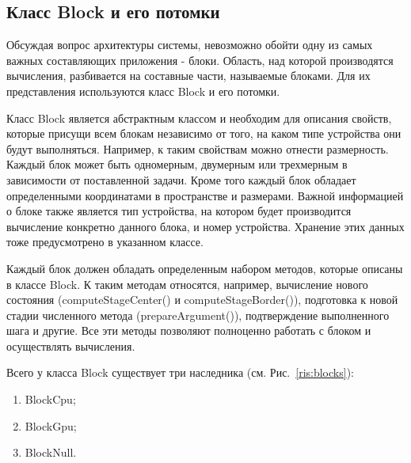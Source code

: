 \documentclass[a4paper, 14pt]{extarticle}
\theoremstyle{definition}
\begin{document}
\subsection{Класс Block и его потомки}

\par Обсуждая вопрос архитектуры системы, невозможно обойти одну из самых важных составляющих приложения - блоки. Область, над которой производятся вычисления, разбивается на составные части, называемые блоками. Для их представления используются класс Block и его потомки.

\par Класс Block является абстрактным классом и необходим для описания свойств, которые присущи всем блокам независимо от того, на каком типе устройства они будут выполняться. Например, к таким свойствам можно отнести размерность. Каждый блок может быть одномерным, двумерным или трехмерным в зависимости от поставленной задачи. Кроме того каждый блок обладает определенными координатами в пространстве и размерами. Важной информацией о блоке также является тип устройства, на котором будет производится вычисление конкретно данного блока, и номер устройства. Хранение этих данных тоже предусмотрено в указанном классе.

\par Каждый блок должен обладать определенным набором методов, которые описаны в классе Block. К таким методам относятся, например, вычисление нового состояния (computeStageCenter() и computeStageBorder()), подготовка к новой стадии численного метода (prepareArgument()), подтверждение выполненного шага и другие. Все эти методы позволяют полноценно работать с блоком и осуществлять вычисления.

\par Всего у класса Block существует три наследника (см. Рис.~\ref{ris:blocks}):
\begin{enumerate}
\item BlockCpu;
\item BlockGpu;
\item BlockNull.
\end{enumerate}
\end{document}
